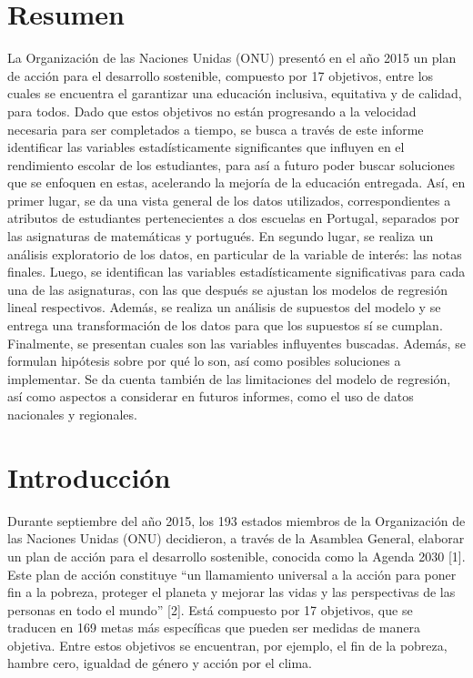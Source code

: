 \documentclass[
]{article}
\begin{document}
\vspace{10mm}

\renewcommand{\tablename}{Tabla}

\hypertarget{resumen}{%
\section{Resumen}\label{resumen}}

La Organización de las Naciones Unidas (ONU) presentó en el año 2015 un
plan de acción para el desarrollo sostenible, compuesto por 17
objetivos, entre los cuales se encuentra el garantizar una educación
inclusiva, equitativa y de calidad, para todos. Dado que estos objetivos
no están progresando a la velocidad necesaria para ser completados a
tiempo, se busca a través de este informe identificar las variables
estadísticamente significantes que influyen en el rendimiento escolar de
los estudiantes, para así a futuro poder buscar soluciones que se
enfoquen en estas, acelerando la mejoría de la educación entregada. Así,
en primer lugar, se da una vista general de los datos utilizados,
correspondientes a atributos de estudiantes pertenecientes a dos
escuelas en Portugal, separados por las asignaturas de matemáticas y
portugués. En segundo lugar, se realiza un análisis exploratorio de los
datos, en particular de la variable de interés: las notas finales.
Luego, se identifican las variables estadísticamente significativas para
cada una de las asignaturas, con las que después se ajustan los modelos
de regresión lineal respectivos. Además, se realiza un análisis de
supuestos del modelo y se entrega una transformación de los datos para
que los supuestos sí se cumplan. Finalmente, se presentan cuales son las
variables influyentes buscadas. Además, se formulan hipótesis sobre por
qué lo son, así como posibles soluciones a implementar. Se da cuenta
también de las limitaciones del modelo de regresión, así como aspectos a
considerar en futuros informes, como el uso de datos nacionales y
regionales.

\hypertarget{introducciuxf3n}{%
\section{Introducción}\label{introducciuxf3n}}

Durante septiembre del año 2015, los 193 estados miembros de la
Organización de las Naciones Unidas (ONU) decidieron, a través de la
Asamblea General, elaborar un plan de acción para el desarrollo
sostenible, conocida como la Agenda 2030 {[}1{]}. Este plan de acción
constituye ``un llamamiento universal a la acción para poner fin a la
pobreza, proteger el planeta y mejorar las vidas y las perspectivas de
las personas en todo el mundo'' {[}2{]}. Está compuesto por 17
objetivos, que se traducen en 169 metas más específicas que pueden ser
medidas de manera objetiva. Entre estos objetivos se encuentran, por
ejemplo, el fin de la pobreza, hambre cero, igualdad de género y acción
por el clima.
\end{document}
